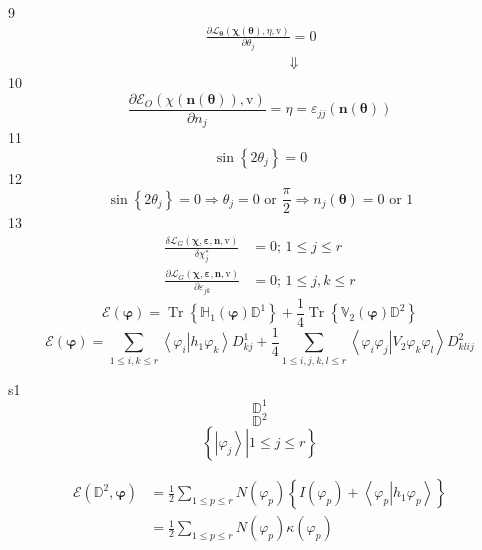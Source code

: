 \documentclass[aps,preprint]{revtex4}%
\begin{document}
9%
\begin{align*}
&  \frac{\partial\mathcal{L}_{\mathbf{\theta}}\left(  \mathbf{\chi}\left(
\mathbf{\theta}\right)  ,\eta\mathbf{,}\mathrm{v}\right)  }{\partial\theta
_{j}}=0\text{ }\\
&  \qquad\qquad\qquad\left.  \Downarrow\right.
\end{align*}
10%
\[
\frac{\partial\mathcal{E}_{O}\left(  \chi\left(  \mathbf{n}\left(
\mathbf{\theta}\right)  \right)  ,\mathrm{v}\right)  }{\partial n_{j}}%
=\eta=\varepsilon_{jj}\left(  \mathbf{\mathbf{n}}\left(  \mathbf{\theta
}\right)  \right)
\]
11%
\[
\sin\left\{  2\theta_{j}\right\}  =0
\]
12%
\[
\sin\left\{  2\theta_{j}\right\}  =0\Rightarrow\theta_{j}=0\text{ or }%
\frac{\pi}{2}\Rightarrow n_{j}\left(  \mathbf{\theta}\right)  =0\text{ or }1
\]
13%
\begin{subequations}
\begin{align*}
\frac{\delta\mathcal{L}_{G}\left(  \mathbf{\chi},\mathbf{\varepsilon
,n,}\mathrm{v}\right)  }{\delta\chi_{j}^{\ast}}  &  =0;\,1\leq j\leq r\\
\frac{\partial\mathcal{L}_{G}\left(  \mathbf{\chi},\mathbf{\varepsilon
,n,}\mathrm{v}\right)  }{\partial\varepsilon_{jk}}  &  =0;\,1\leq j,k\leq r
\end{align*}%
\end{subequations}
\[
\mathcal{E}\left(  \bm{\varphi}\right)  =\operatorname{Tr}\left\{
\mathbb{H}_{1}\left(  \bm{\varphi}\right)  \mathbb{D}^{1}\right\}  +\frac
{1}{4}\operatorname{Tr}\left\{  \mathbb{V}_{2}\left(  \bm{\varphi}\right)
\mathbb{D}^{2}\right\}
\]%
\[
\mathcal{E}\left(  \bm{\varphi}\right)  =\sum_{1\leq i,k\leq r}\left\langle
\left.  \varphi_{i}\right\vert h_{1}\varphi_{k}\right\rangle D_{kj}^{1}%
+\frac{1}{4}\sum_{1\leq i,j,k,l\leq r}\left\langle \left.  \varphi_{i}%
\varphi_{j}\right\vert V_{2}\varphi_{k}\varphi_{l}\right\rangle D_{klij}^{2}%
\]


s1%
\[
\mathbb{D}^{1}%
\]%
\[
\mathbb{D}^{2}%
\]%
\[
\left\{  \left.  \left\vert \varphi_{j}\right\rangle \right\vert 1\leq j\leq
r\right\}
\]
%

\begin{align*}
\mathcal{E}\left(  \mathbb{D}^{2},\mathbf{\varphi}\right)   &  =\frac{1}%
{2}\sum_{1\leq p\leq r}N\left(  \varphi_{p}\right)  \left\{  I\left(
\varphi_{p}\right)  +\left\langle \left.  \varphi_{p}\right\vert h_{1}%
\varphi_{p}\right\rangle \right\} \\
&  =\frac{1}{2}%
{\textstyle\sum\limits_{1\leq p\leq r}}
N\left(  \varphi_{p}\right)  \kappa\left(  \varphi_{p}\right)
\end{align*}
%
\end{document}
